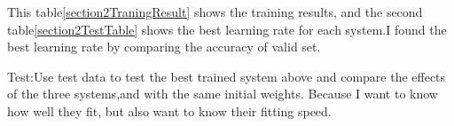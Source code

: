 \documentclass{article}
\begin{document}
This table\ref{section2TraningResult} shows the training results, and the second table\ref{section2TestTable} shows the best learning rate for each system.I found the best learning rate by comparing the accuracy of valid set.

Test:Use test data to test the best trained system above and compare the effects of the three systems,and with the same initial weights.
Because I want to know how well they fit, but also want to know their fitting speed.


\begin{figure}[H]\label{q2:rmspandadam}
	\centering  %
	\label{Fig.main}
\end{figure}

\begin{figure}[H]\label{q2:sgd}
	\centering  %
	\label{Fig.main}
\end{figure}
\end{document}

